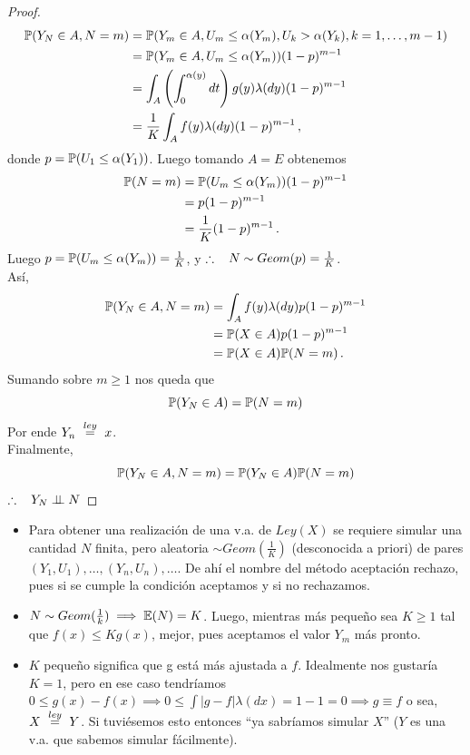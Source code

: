 \begin{proof}
\gris 
\begin{alignat*}{2}
    \P(Y_N\in A, N=m) & = \P(Y_m\in A, U_m \leq \alpha(Y_m),U_k>\alpha(Y_k),k=1,\dots,m-1) \\
     & = \P(Y_m\in A,U_m\leq \alpha(Y_m))(1-p)^{m-1} %
     \\&  = \displaystyle \int_A \left(\int^{\alpha(y)}_0 dt\right)g(y)\lambda(dy)(1-p)^{m-1}
     \\ & = \frac{1}{K}\int_Af(y)\lambda(dy)(1-p)^{m-1} \, ,
\end{alignat*}
donde $p=\P(U_1\leq\alpha(Y_1))$. Luego tomando $A=E$ obtenemos
\begin{alignat*}{2}
    \P(N=m) & = \P(U_m \leq \alpha(Y_m))(1-p)^{m-1} \\
     & = p(1-p)^{m-1}
     \\ & = \frac{1}{K}(1-p)^{m-1} \, .
\end{alignat*}
Luego $p=\P(U_m\leq \alpha(Y_m))=\frac{1}{K}$, y $\therefore \espacio N\sim Geom(p)=\frac{1}{K}$.
\\ Así,
\begin{alignat*}{2}
    \P(Y_N\in A, N=m) & = \displaystyle \int_A f(y)\lambda(dy) p(1-p)^{m-1} \\
     & = \P(X\in A)p(1-p)^{m-1}
     \\ & =  \P(X\in A)\P(N=m) \, .
\end{alignat*} 
Sumando sobre $m\geq 1$ nos queda que
$$ \P(Y_N\in A) = \P(N=m)$$
Por ende $Y_n \igualley x$.
\\ Finalmente,
$$ \P(Y_N\in A, N=m) = \P(Y_N\in A)\P(N=m) $$
$\therefore \espacio Y_N\indep N$
\findem \negro
\end{proof}
\begin{remark}
\beforeitemize
\begin{itemize}
    \item Para obtener una realización de una v.a. de $Ley(X)$ se requiere simular una cantidad $N$ finita, pero aleatoria $\sim Geom(\frac{1}{K})$ (desconocida a priori) de pares $(Y_1,U_1),\dots,(Y_n,U_n),\dots$.
    \newline De ahí el nombre del método aceptación rechazo, pues si se cumple la condición aceptamos y si no rechazamos.
    \item $N\sim Geom(\frac{1}{k}) \implies \E(N)=K$. Luego, mientras más pequeño sea $K\geq 1$ tal que $f(x)\leq Kg(x)$, mejor, pues aceptamos el valor $Y_m$ más pronto.
    \item $K$ pequeño significa que g está más ajustada a $f$. Idealmente nos gustaría $K=1$, pero en ese caso tendríamos $0\leq g(x)-f(x)\implies 0\leq\int|g-f|\lambda(dx)=1-1=0\implies g\equiv f$ o sea, $X\igualley Y$. Si tuviésemos esto entonces ``ya sabríamos simular $X$'' ($Y$ es una v.a. que sabemos simular fácilmente).
\end{itemize}
\end{remark}

